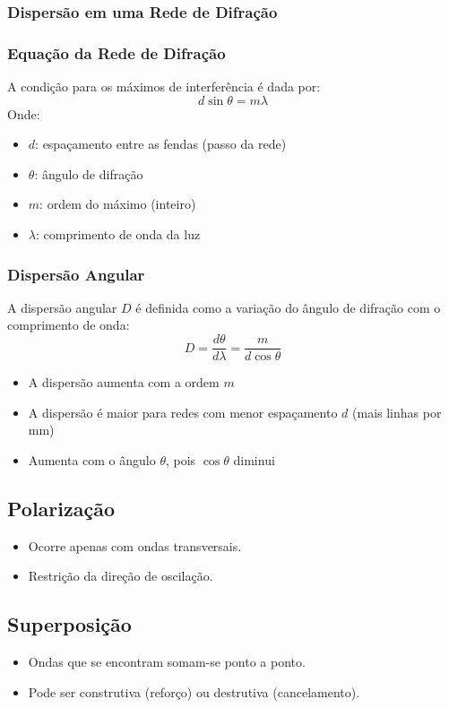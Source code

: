 \documentclass[a4paper,12pt]{article}
\begin{document}
\begin{multicols}{2}
\subsubsection{Dispersão em uma Rede de Difração}

\subsubsection{Equação da Rede de Difração}
A condição para os máximos de interferência é dada por:
\[
d \sin\theta = m \lambda
\]
Onde:
\begin{itemize}
  \item \( d \): espaçamento entre as fendas (passo da rede)
  \item \( \theta \): ângulo de difração
  \item \( m \): ordem do máximo (inteiro)
  \item \( \lambda \): comprimento de onda da luz
\end{itemize}

\subsubsection{Dispersão Angular}
A dispersão angular \( D \) é definida como a variação do ângulo de difração com o comprimento de onda:
\[
D = \frac{d\theta}{d\lambda} = \frac{m}{d \cos\theta}
\]

\begin{itemize}
  \item A dispersão aumenta com a ordem \( m \)
  \item A dispersão é maior para redes com menor espaçamento \( d \) (mais linhas por mm)
  \item Aumenta com o ângulo \( \theta \), pois \( \cos\theta \) diminui
\end{itemize}

\subsection{Polarização}
\begin{itemize}
    \item Ocorre apenas com ondas transversais.
    \item Restrição da direção de oscilação.
\end{itemize}

\subsection{Superposição}
\begin{itemize}
    \item Ondas que se encontram somam-se ponto a ponto.
    \item Pode ser construtiva (reforço) ou destrutiva (cancelamento).
\end{itemize}


\end{multicols}
\end{document}
